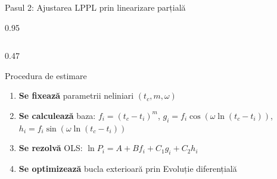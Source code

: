\documentclass[9pt, aspectratio=169, t]{beamer}
\begin{document}
\begin{frame}{Pasul 2: Ajustarea LPPL prin linearizare parțială}
    \begin{cminipage}{0.95\textwidth}
    {\scriptsize
    \begin{columns}[T]
        \begin{column}{0.47\textwidth}
            \begin{block}{Procedura de estimare}
                \begin{enumerate}\setlength{\itemsep}{1pt}
                    \item \textbf{Se fixează} parametrii neliniari $(t_c, m, \omega)$
                    \item \textbf{Se calculează} baza: $f_i = (t_c - t_i)^m$, $g_i = f_i\cos(\omega\ln(t_c - t_i))$, $h_i = f_i\sin(\omega\ln(t_c - t_i))$
                    \item \textbf{Se rezolvă} OLS: $\ln P_i = A + Bf_i + C_1 g_i + C_2 h_i$
                    \item \textbf{Se optimizează} bucla exterioară prin Evoluție diferențială
                \end{enumerate}
            \end{block}


\end{column}
\end{columns}}
\end{cminipage}
\end{frame}
\end{document}
